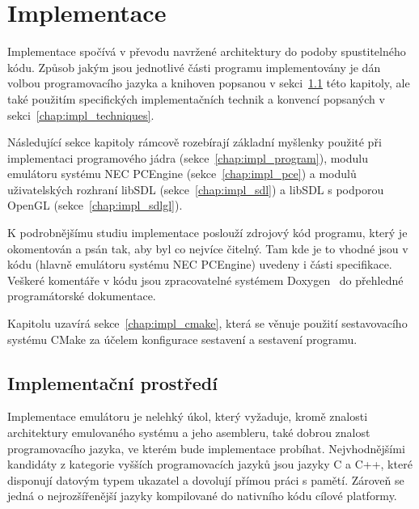 
\chapter{Implementace}\label{chap:impl}

Implementace spočívá v převodu navržené architektury do podoby spustitelného
kódu. Způsob jakým jsou jednotlivé části programu implementovány je dán volbou
programovacího jazyka a knihoven popsanou v sekci~\ref{chap:impl_env} této
kapitoly, ale také použitím specifických implementačních technik a konvencí
popsaných v sekci~\ref{chap:impl_techniques}.

Následující sekce kapitoly rámcově rozebírají základní myšlenky použité při
implementaci programového jádra (sekce~\ref{chap:impl_program}), modulu
emulátoru systému NEC PCEngine (sekce~\ref{chap:impl_pce}) a modulů
uživatelských rozhraní libSDL (sekce~\ref{chap:impl_sdl}) a libSDL s podporou
OpenGL (sekce~\ref{chap:impl_sdlgl}).

K podrobnějšímu studiu implementace poslouží zdrojový kód programu, který je
okomentován a psán tak, aby byl co nejvíce čitelný. Tam kde je to vhodné jsou v
kódu (hlavně emulátoru systému NEC PCEngine) uvedeny i části specifikace.
Veškeré komentáře v kódu jsou zpracovatelné systémem Doxygen~\cite{wwwDoxygen}
do přehledné programátorské dokumentace.

Kapitolu uzavírá sekce~\ref{chap:impl_cmake}, která se věnuje použití
sestavovacího systému CMake za účelem konfigurace sestavení a sestavení
programu.


\section{Implementační prostředí}\label{chap:impl_env}

Implementace emulátoru je nelehký úkol, který vyžaduje, kromě znalosti
architektury emulovaného systému a jeho asembleru, také dobrou znalost
programovacího jazyka, ve kterém bude implementace probíhat. Nejvhodnějšími
kandidáty z kategorie vyšších programovacích jazyků jsou jazyky C a C++, které
disponují datovým typem ukazatel a dovolují přímou práci s pamětí. Zároveň se
jedná o nejrozšířenější jazyky kompilované do nativního kódu cílové platformy.

